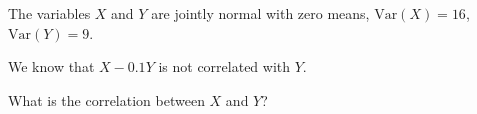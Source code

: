
\begin{question}
The variables \(X\) and \(Y\) are jointly normal with zero means, \(\mathrm{Var}(X) = 16\),
\(\mathrm{Var}(Y) = 9\).

We know that \(X -0.1 Y\) is not correlated with \(Y\).

What is the correlation between \(X\) and \(Y\)?
\end{question}


